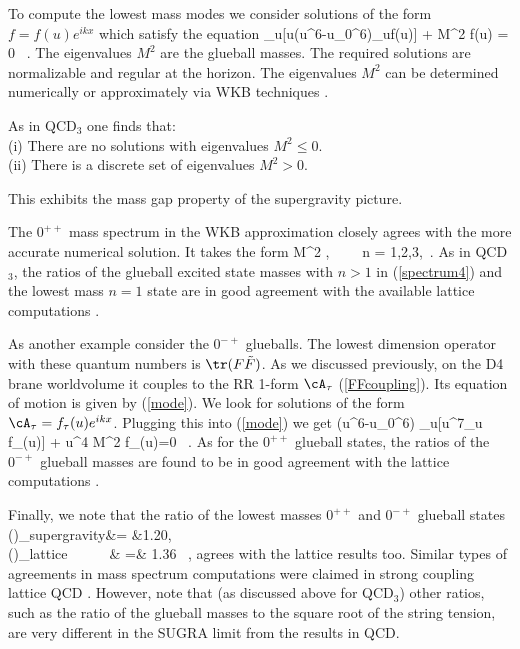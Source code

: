 To compute the lowest mass modes
we consider solutions of the form $f = f(u) e^{ikx}$ 
which satisfy the equation
\beq
{}\partial_{u}[u(u^6-u_0^6)\partial_{u}f(u)] + M^2 f(u) = 0 \ .
\eeq
The eigenvalues $M^2$ are the glueball masses.  The required solutions
are normalizable and regular at the horizon.  The eigenvalues $M^2$
can be determined numerically \cite{Hashimoto:1998ao} or approximately
via WKB techniques \cite{Minahan:1999tm}.

As in QCD$_3$ one finds that:\\
(i) There are no solutions with eigenvalues $M^2 \leq 0$.\\
(ii) There is a discrete set of eigenvalues $M^2 > 0$.

This exhibits the mass gap property of the supergravity picture.

The $0^{++}$ mass spectrum in the WKB approximation closely agrees with the
more accurate numerical solution.
It takes the form
\beq
M^2 \approx {},~~~~ n = 1,2,3,\cdots \ .
\label{spectrum4}
\eeq
As in QCD$_3$,  the ratios of the glueball excited state masses with $n > 1$
in (\ref{spectrum4}) and the lowest mass $n=1$ state are in good agreement
with the available lattice computations \cite{Hashimoto:1998ao, Csaki:1998gm}. 


As another example consider the $0^{-+}$ glueballs.
The lowest dimension operator with these quantum numbers is $\tr(F \tilde{F})$.
As we discussed previously, 
on the D4 brane worldvolume it couples to the RR 1-form
$\cA_{\tau}$ (\ref{FFcoupling}).
Its equation of motion is given by (\ref{mode}).
We look for solutions of the form $\cA_{\tau} = f_{\tau}(u)e^{ikx}$.
Plugging this into (\ref{mode}) we get
\beq
{}(u^6-u_0^6) \partial_u[u^7\partial_u f_{\tau}(u)] 
+ u^4 M^2 f_{\tau}(u)=0 \ .
\eeq
As for the $0^{++}$ glueball states, the 
ratios of the $0^{-+}$ glueball masses 
are found to be in good agreement
with the lattice computations 
\cite{Hashimoto:1998ao}.

Finally, we note that the
ratio of the lowest masses
$0^{++}$ and $0^{-+}$ glueball
states \cite{Hashimoto:1998ao}
\beqar
\left(\right)_{{\rm supergravity}}&= &1.20, 
\nonumber\\
\left(\right)_{{\rm lattice~~~~~~}}& =&
1.36  \ ,
\eeqar
agrees with the lattice results too.
Similar types of agreements 
in mass spectrum computations were claimed 
in strong coupling lattice QCD \cite{Munster:1983ps}.
However, note that (as discussed above for QCD$_3$)
other ratios, such as the ratio of the glueball masses
to the square root of the string tension, are very different in the SUGRA
limit from the results in QCD.

